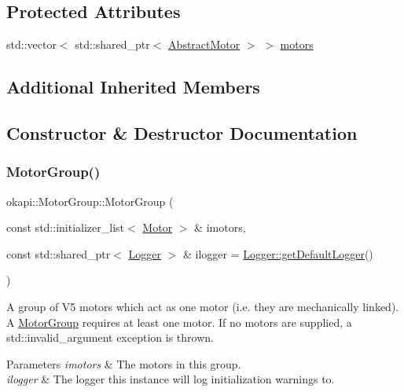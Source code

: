 \subsection*{Protected Attributes}
\begin{DoxyCompactItemize}
\item 
std\+::vector$<$ std\+::shared\+\_\+ptr$<$ \mbox{\hyperlink{classokapi_1_1AbstractMotor}{Abstract\+Motor}} $>$ $>$ \mbox{\hyperlink{classokapi_1_1MotorGroup_a025b488e3877fc4b0aa032c57f6ba1d4}{motors}}
\end{DoxyCompactItemize}
\subsection*{Additional Inherited Members}


\subsection{Constructor \& Destructor Documentation}
\mbox{\label{classokapi_1_1MotorGroup_a6bc96434556403fecf7e715faa6359f9}} 
\subsubsection{\texorpdfstring{MotorGroup()}{MotorGroup()}\hspace{0.1cm}{\footnotesize\ttfamily [1/2]}}
{\footnotesize\ttfamily okapi\+::\+Motor\+Group\+::\+Motor\+Group (\begin{DoxyParamCaption}\item[{const std\+::initializer\+\_\+list$<$ \mbox{\hyperlink{classokapi_1_1Motor}{Motor}} $>$ \&}]{imotors,  }\item[{const std\+::shared\+\_\+ptr$<$ \mbox{\hyperlink{classokapi_1_1Logger}{Logger}} $>$ \&}]{ilogger = {\ttfamily \mbox{\hyperlink{classokapi_1_1Logger_a5053cf778b4b55acba788a3797dc96d2}{Logger\+::get\+Default\+Logger}}()} }\end{DoxyParamCaption})}

A group of V5 motors which act as one motor (i.\+e. they are mechanically linked). A \mbox{\hyperlink{classokapi_1_1MotorGroup}{Motor\+Group}} requires at least one motor. If no motors are supplied, a {\ttfamily std\+::invalid\+\_\+argument} exception is thrown.


\begin{DoxyParams}{Parameters}
{\em imotors} & The motors in this group. \\
\hline
{\em ilogger} & The logger this instance will log initialization warnings to. \\
\hline
\end{DoxyParams}
\mbox{\label{classokapi_1_1MotorGroup_a7b0d2c64bb1c78c117160b8dfeb07611}} 
